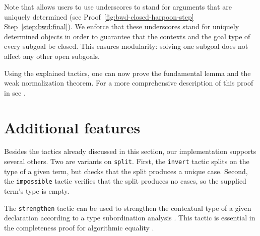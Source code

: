 Note that \Harpoon{} allows users to use underscores to stand for arguments that
are uniquely determined
(see \Harpoon{} Proof~\ref{fig:bwd-closed-harpoon-step}
Step~\ref{step:bwd:final}).
We enforce that these underscores stand for uniquely determined objects in order
to guarantee that the contexts and the goal type of every subgoal be
closed. This ensures modularity: solving one subgoal does not affect any
other open subgoals.


\begin{HarpoonProof}[h]
  
\end{HarpoonProof}

Using the explained tactics, one can now prove the fundamental lemma and the weak
normalization theorem. For a more comprehensive description of this
proof in \Beluga{} see \cite{Cave:LFMTP13,Cave:MSCS18}.

\section{Additional features}

Besides the tactics already discussed in this section, our
implementation supports several others.
%
Two are variants on \lstinline!split!. First, the \lstinline!invert! tactic
splits on the type of a given term, but checks that the split produces a unique case. Second, the
\lstinline!impossible! tactic verifies that the split produces no cases, so the
supplied term's type is empty.

The \lstinline!strengthen! tactic can be used to strengthen the contextual type
of a given declaration according to a type subordination analysis \cite{something}.
This tactic is essential in the completeness proof for algorithmic equality
\cite{Cave:MSCS18}.

